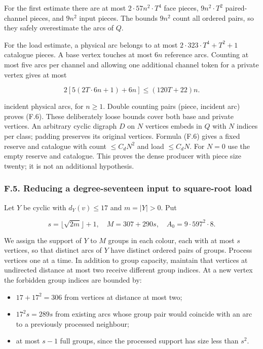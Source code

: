 \documentclass[english,11pt,a4paper]{article}
\providecommand{\tightlist}{\setlength{\itemsep}{0pt}\setlength{\parskip}{0pt}}
\begin{document}
For the first estimate there are at most \(2\cdot 57n^{2}\cdot T^{4}\) face pieces, \(9n^{2}\cdot T^{2}\) paired-channel pieces, and \(9n^{2}\) input pieces. The bounds \(9n^{2}\) count all ordered pairs, so they safely overestimate the arcs of \(Q\).

For the load estimate, a physical arc belongs to at most \(2\cdot 323\cdot T^{4}+T^{2}+1\) catalogue pieces. A base vertex touches at most \(6n\) reference arcs. Counting at most five arcs per channel and allowing one additional channel token for a private vertex gives at most

\[2[5(2T\cdot6n+1)+6n]\le(120T+22)n.\]

incident physical arcs, for \(n\ge 1\). Double counting pairs (piece, incident arc) proves (F.6). These deliberately loose bounds cover both base and private vertices. An arbitrary cyclic digraph \(D\) on \(N\) vertices embeds in \(Q\) with \(N\) indices per class; padding preserves its original vertices. Formula (F.6) gives a fixed reserve and catalogue with count \(\le C_dN^2\) and load \(\le C_dN\). For \(N=0\) use the empty reserve and catalogue. This proves the dense producer with piece size twenty; it is not an additional hypothesis.

\subsubsection{F.5. Reducing a degree-seventeen input to square-root load}\label{f.5.-reducing-a-degree-seventeen-input-to-square-root-load}

Let \(Y\) be cyclic with \(d_{Y}(v)\le 17\) and \(m=|Y|>0\). Put

\[s=\lfloor\sqrt{2m}\rfloor+1,\quad M=307+290s,\quad A_0=9\cdot597^2\cdot8.\tag{F.7}\]

We assign the support of \(Y\) to \(M\) groups in each colour, each with at most \(s\) vertices, so that distinct arcs of \(Y\) have distinct ordered pairs of groups. Process vertices one at a time. In addition to group capacity, maintain that vertices at undirected distance at most two receive different group indices. At a new vertex the forbidden group indices are bounded by:

\begin{itemize}
\tightlist
\item
  \(17+17^{2}=306\) from vertices at distance at most two;
\item
  \(17^2s=289s\) from existing arcs whose group pair would coincide with an arc to a previously processed neighbour;
\item
  at most \(s-1\) full groups, since the processed support has size less than \(s^{2}\).
\end{itemize}
\end{document}
